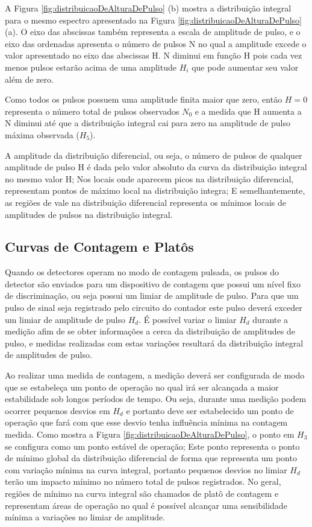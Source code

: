 \documentclass[11pt,a4paper]{article}
\begin{document}
			A Figura \ref{fig:distribuicaoDeAlturaDePulso} (b) mostra a distribuição integral para o mesmo espectro apresentado na Figura \ref{fig:distribuicaoDeAlturaDePulso} (a). O eixo das abscissas também representa a escala de amplitude de pulso, e o eixo das ordenadas apresenta o número de pulsos N no qual a amplitude excede o valor apresentado no eixo das abscissas H. N diminui em função H pois cada vez menos pulsos estarão acima de uma amplitude $H_i$ que pode aumentar seu valor além de zero. 
			
			Como todos os pulsos possuem uma amplitude finita maior que zero, então $H = 0$ representa o número total de pulsos observados $N_0$ e a medida que H aumenta a N diminui até que a distribuição integral cai para zero na amplitude de pulso máxima observada ($H_5$). 


		A amplitude da distribuição diferencial, ou seja, o número de pulsos de qualquer amplitude de pulso H é dada pelo valor absoluto da curva da distribuição integral no mesmo valor H; Nos locais onde aparecem picos na distribuição diferencial, representam pontos de máximo local na distribuição integra; E semelhantemente, as regiões de vale na distribuição diferencial representa os mínimos locais de amplitudes de pulsos na distribuição integral. 


	\subsection{Curvas de Contagem e Platôs}

		Quando os detectores operam no modo de contagem pulsada, os pulsos do detector são enviados para um dispositivo de contagem que possui um nível fixo de discriminação, ou seja possui um limiar de amplitude de pulso. Para que um pulso de sinal seja registrado pelo circuito do contador este pulso deverá exceder um limiar de amplitude de pulso $H_d$. É possível variar o limiar $H_d$ durante a medição afim de se obter informações a cerca da distribuição de amplitudes de pulso, e medidas realizadas com estas variações resultará da distribuição integral de amplitudes de pulso. 

		Ao realizar uma medida de contagem, a medição deverá ser configurada de modo que se estabeleça um ponto de operação no qual irá ser alcançada a maior estabilidade sob longos períodos de tempo. Ou seja, durante uma medição podem ocorrer pequenos desvios em $H_d$ e portanto deve ser estabelecido um ponto de operação que fará com que esse desvio tenha influência mínima na contagem medida. Como mostra a Figura \ref{fig:distribuicaoDeAlturaDePulso}, o ponto em $H_3$ se configura como um ponto estável de operação; Este ponto representa o ponto de mínimo global da distribuição diferencial de forma que representa um ponto com  variação mínima na curva integral, portanto pequenos desvios no limiar $H_d$ terão um impacto mínimo no número total de pulsos registrados. No geral, regiões de mínimo na curva integral são chamados de platô de contagem e representam áreas de operação no qual é possível alcançar uma sensibilidade mínima a variações no limiar de amplitude. 
\end{document}

